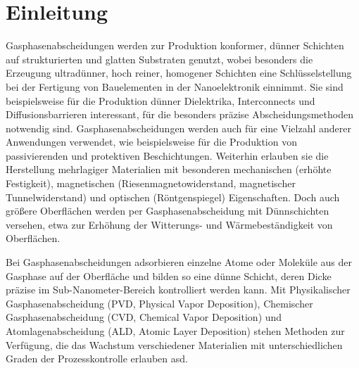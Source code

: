 \chapter{Einleitung}
\label{intro}

Gasphasenabscheidungen werden zur Produktion konformer, dünner Schichten auf strukturierten und glatten Substraten genutzt, wobei besonders die Erzeugung ultradünner, hoch reiner, homogener Schichten eine Schlüsselstellung bei der Fertigung von Bauelementen in der Nanoelektronik einnimmt\cite{grannemann_thin_1993}.
Sie sind beispielsweise für die Produktion dünner Dielektrika\cite{gordon_vapor_2001}, Interconnects\cite{waechtler_copper_2009} und Diffusionsbarrieren\cite{grannemann_thin_1993,raaijmakers_low_1994} interessant, für die besonders präzise Abscheidungsmethoden notwendig sind.
Gasphasenabscheidungen werden auch für eine Vielzahl anderer Anwendungen verwendet, wie beispielsweise für die Produktion von passivierenden und protektiven Beschichtungen\cite{higashiwaki_algan/gan_2006,jankowski_subnanometer_1989}.
Weiterhin erlauben sie die Herstellung mehrlagiger Materialien mit besonderen mechanischen (erhöhte Festigkeit)\cite{cammarata_nanoindentation_1990}, magnetischen (Riesenmagnetowiderstand\cite{peter_influence_2007,seyama_giant_1999,bird_giant_1995}, magnetischer Tunnelwiderstand\cite{sun_magnetic_2006}) und optischen (Röntgenspiegel\cite{jankowski_subnanometer_1989}) Eigenschaften.
Doch auch größere Oberflächen werden per Gasphasenabscheidung mit Dünnschichten versehen, etwa zur Erhöhung der Witterungs- und Wärmebeständigkeit von Oberflächen\cite{mccurdy_successful_1999}.

Bei Gasphasenabscheidungen adsorbieren einzelne Atome oder Moleküle aus der Gasphase auf der Oberfläche und bilden so eine dünne Schicht, deren Dicke präzise im Sub-Nanometer-Bereich kontrolliert werden kann\cite{mattox_handbook_2010,pierson_handbook_1999}.
Mit Physikalischer Gasphasenabscheidung (PVD, Physical Vapor Deposition), Chemischer Gasphasenabscheidung (CVD, Chemical Vapor Deposition) und Atomlagenabscheidung (ALD, Atomic Layer Deposition) stehen Methoden zur Verfügung, die das Wachstum verschiedener Materialien mit unterschiedlichen Graden der Prozesskontrolle erlauben asd.

